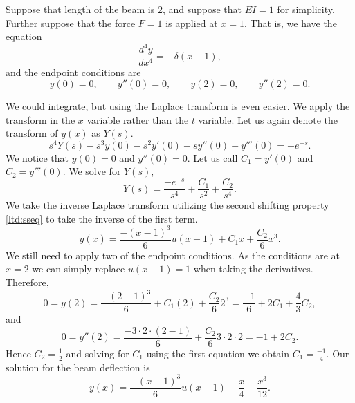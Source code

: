 \documentclass[12pt]{book}
\begin{document}
\begin{example} \label{lt:examplebeam}
Suppose that length of the beam is 2, and suppose that $EI=1$ for
simplicity.  Further suppose that the force $F=1$ is applied at $x=1$.
That is, we have the equation
\begin{equation*}
\frac{d^4 y}{dx^4} = -\delta(x-1) ,
\end{equation*}
and the endpoint conditions are
\begin{equation*}
y(0) = 0, \qquad y''(0) = 0, \qquad
y(2) = 0, \qquad y''(2) = 0.
\end{equation*}

We could integrate, but using the Laplace transform
is even easier.
We apply the transform
in the $x$ variable rather than the $t$ variable.  Let us again denote the
transform of $y(x)$ as $Y(s)$.
\begin{equation*}
s^4Y(s)-s^3y(0)-s^2y'(0)-sy''(0)-y'''(0)
= -e^{-s}.
\end{equation*}
We notice that $y(0) = 0$ and $y''(0) = 0$.  Let us
call $C_1 = y'(0)$ and $C_2=y'''(0)$.
We solve for $Y(s)$,
\begin{equation*}
Y(s) = \frac{-e^{-s}}{s^4} + \frac{C_1}{s^2}+ \frac{C_2}{s^4} .
\end{equation*}
We take the inverse Laplace transform utilizing the 
second shifting property \eqref{ltd:sseq} to take the inverse of the first
term.
\begin{equation*}
y(x) = \frac{-{(x-1)}^3}{6} u(x-1) + C_1 x + \frac{C_2}{6} x^3 .
\end{equation*}
We still need to apply two of the endpoint conditions.  As the conditions
are at $x=2$ we can simply replace $u(x-1) = 1$ when taking
the derivatives.  Therefore,
\begin{equation*}
0 = y(2) = \frac{-{(2-1)}^3}{6} + C_1 (2) + \frac{C_2}{6} 2^3 =
\frac{-1}{6} + 2 C_1 + \frac{4}{3} C_2 ,
\end{equation*}
and
\begin{equation*}
0 = y''(2) = \frac{-3\cdot 2 \cdot (2-1)}{6} + \frac{C_2}{6} 3\cdot 2 \cdot 2
 = -1 + 2 C_2 .
\end{equation*}
Hence $C_2 = \frac{1}{2}$ and solving for $C_1$ using the first
equation we obtain
$C_1 = \frac{-1}{4}$.  Our solution for the beam deflection is
\begin{equation*}
y(x) = \frac{-{(x-1)}^3}{6} u(x-1) - \frac{x}{4} + \frac{x^3}{12} .
\end{equation*}
\end{example}
\end{document}

